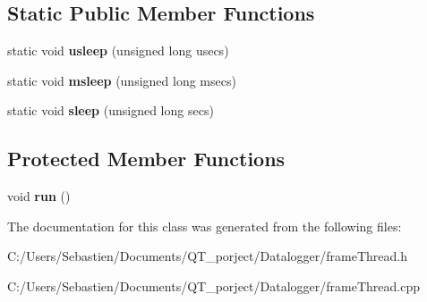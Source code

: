 \subsection*{Static Public Member Functions}
\begin{DoxyCompactItemize}
\item 
\mbox{\label{class_frame_thread_af15b98f08d8a1ef3f50b3d104c1c6480}} 
static void {\bfseries usleep} (unsigned long usecs)
\item 
\mbox{\label{class_frame_thread_afc09a4dccf48df22ad59b326aee352bd}} 
static void {\bfseries msleep} (unsigned long msecs)
\item 
\mbox{\label{class_frame_thread_a65fc75d57b3f490f20f0bc02815b6f39}} 
static void {\bfseries sleep} (unsigned long secs)
\end{DoxyCompactItemize}
\subsection*{Protected Member Functions}
\begin{DoxyCompactItemize}
\item 
\mbox{\label{class_frame_thread_a9efe242632d25b5e6f54f6319567a7ad}} 
void {\bfseries run} ()
\end{DoxyCompactItemize}


The documentation for this class was generated from the following files\+:\begin{DoxyCompactItemize}
\item 
C\+:/\+Users/\+Sebastien/\+Documents/\+Q\+T\+\_\+porject/\+Datalogger/frame\+Thread.\+h\item 
C\+:/\+Users/\+Sebastien/\+Documents/\+Q\+T\+\_\+porject/\+Datalogger/frame\+Thread.\+cpp\end{DoxyCompactItemize}
